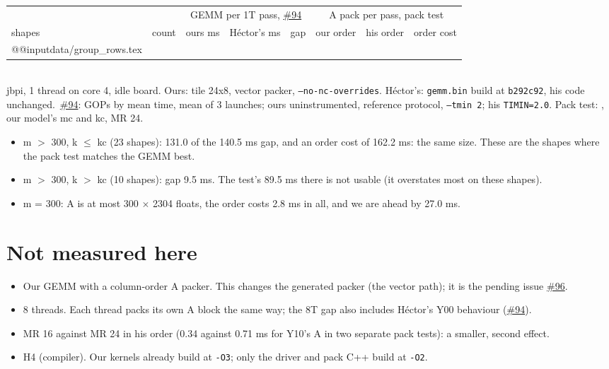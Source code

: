 \documentclass[10pt,a4paper]{article}
\newcommand{\iss}[1]{\href{https://github.com/JieGH/RVV_code_gen_via_MLIR_xDSL/issues/#1}{\##1}}
\newcommand{\D}{data}
\newcommand{\note}[1]{\\[2pt]{\footnotesize\color{muted}#1}}
\newcommand{\onet}{jbpi, 1 thread on core 4, idle board. Ours: tile 24x8, vector packer, \texttt{--no-nc-overrides}. H\'ector's: \texttt{gemm.bin} build at \texttt{b292c92}, his code unchanged.}
\begin{document}
\begin{center}\small
\begin{tabular}{@{}l r rrr rrr@{}}
\toprule
 & & \multicolumn{3}{c}{GEMM per 1T pass, \iss{94}} & \multicolumn{3}{c}{A pack per pass, pack test} \\
\cmidrule(lr){3-5}\cmidrule(l){6-8}
shapes & count & ours ms & H\'ector's ms & gap & our order & his order & order cost \\
\midrule
\csname @@input\endcsname \D/group_rows.tex
\bottomrule
\end{tabular}
\note{\onet\ \iss{94}: GOPs by mean time, mean of 3 launches; ours uninstrumented, reference protocol, \texttt{--tmin 2}; his \texttt{TIMIN=2.0}. Pack test: , our model's mc and kc, MR 24.}
\end{center}
\begin{itemize}\setlength\itemsep{1pt}
\item m $>$ 300, k $\le$ kc (23 shapes): 131.0 of the 140.5 ms gap, and an order cost of 162.2 ms: the same size. These are the shapes where the pack test matches the GEMM best.
\item m $>$ 300, k $>$ kc (10 shapes): gap 9.5 ms. The test's 89.5 ms there is not usable (it overstates most on these shapes).
\item m = 300: A is at most 300 $\times$ 2304 floats, the order costs 2.8 ms in all, and we are ahead by 27.0 ms.
\end{itemize}

\section{Not measured here}
\begin{itemize}\setlength\itemsep{1pt}
\item Our GEMM with a column-order A packer. This changes the generated packer (the vector path); it is the pending issue \iss{96}.
\item 8 threads. Each thread packs its own A block the same way; the 8T gap also includes H\'ector's Y00 behaviour (\iss{94}).
\item MR 16 against MR 24 in his order (0.34 against 0.71 ms for Y10's A in two separate pack tests): a smaller, second effect.
\item H4 (compiler). Our kernels already build at \texttt{-O3}; only the driver and pack C++ build at \texttt{-O2}.
\end{itemize}

\appendix
\end{document}
